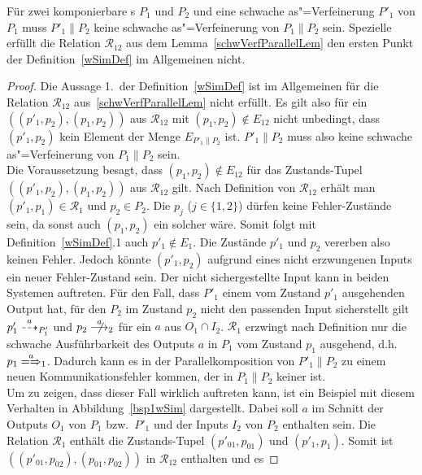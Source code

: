 \begin{Prop}
  \label{schwVerfParallelProp}
  Für zwei komponierbare \MEIO{}s $P_1$ und $P_2$ und eine schwache
  as"=Verfeinerung $P'_1$ von $P_1$ muss $P'_1\|P_2$ keine schwache
  as"=Verfeinerung von $P_1\|P_2$ sein. Spezielle erfüllt die Relation
  $\mathcal{R}_{12}$ aus dem Lemma~\ref{schwVerfParallelLem} den ersten Punkt
  der Definition~\ref{wSimDef} im Allgemeinen nicht.
\end{Prop}
\begin{proof}
  Die Aussage 1.\ der Definition~\ref{wSimDef} ist im Allgemeinen für die
  Relation $\mathcal{R}_{12}$ aus~\ref{schwVerfParallelLem} nicht erfüllt. Es
  gilt also für ein $((p'_1,p_2),(p_1,p_2))$ aus $\mathcal{R}_{12}$ mit
  $(p_1,p_2)\notin E_{12}$ nicht unbedingt, dass $(p'_1,p_2)$ kein Element der
  Menge $E_{P'_1\|P_2}$ ist. $P'_1\|P_2$ muss also keine schwache
  as"=Verfeinerung von $P_1\|P_2$ sein.\\
  Die Voraussetzung besagt, dass $(p_1,p_2)\notin E_{12}$ für das
  Zustands-Tupel $((p'_1,p_2),(p_1,p_2))$ aus $\mathcal{R}_{12}$ gilt. Nach
  Definition von $\mathcal{R}_{12}$ erhält man $(p'_1,p_1)\in\mathcal{R}_1$ und
  $p_2\in P_2$. Die $p_j$ ($j\in\{1,2\}$) dürfen keine Fehler-Zustände sein, da
  sonst auch $(p_1,p_2)$ ein solcher wäre. Somit folgt mit
  Definition~\ref{wSimDef}.1 auch $p'_1\notin E_1$. Die Zustände $p'_1$ und
  $p_2$ vererben also keinen Fehler. Jedoch könnte $(p'_1,p_2)$ aufgrund eines
  nicht erzwungenen Inputs ein neuer Fehler-Zustand sein. Der nicht
  sichergestellte Input kann in beiden Systemen auftreten. Für den Fall, dass
  $P'_1$ einem vom Zustand $p'_1$ ausgehenden Output hat, für den $P_2$ im
  Zustand $p_2$ nicht den passenden Input sicherstellt gilt
  $p'_1\may[a]_{P'_1}$ und $p_2\nmust[a]_2$ für ein $a$ aus $O_1\cap I_2$.
  $\mathcal{R}_1$ erzwingt nach Definition nur die schwache Ausführbarkeit des
  Outputs $a$ in $P_1$ vom Zustand $p_1$ ausgehend, d.h.\ $p_1 \weakmay[a]_1$.
  Dadurch kann es in der Parallelkomposition von $P'_1\|P_2$ zu einem neuen
  Kommunikationsfehler kommen, der in $P_1\|P_2$ keiner ist.\\
  Um zu zeigen, dass dieser Fall wirklich auftreten kann, ist ein Beispiel mit
  diesem Verhalten in Abbildung~\ref{bsp1wSim} dargestellt. Dabei soll $a$ im
  Schnitt der Outputs $O_1$ von $P_1$ bzw.\ $P'_1$ und der Inputs $I_2$ von
  $P_2$ enthalten sein. Die Relation $\mathcal{R}_1$ enthält die Zustands-Tupel
  $(p'_{01},p_{01})$ und $(p'_1,p_1)$. Somit ist
  $((p'_{01},p_{02}),(p_{01},p_{02}))$ in $\mathcal{R}_{12}$ enthalten und es

\end{proof}
